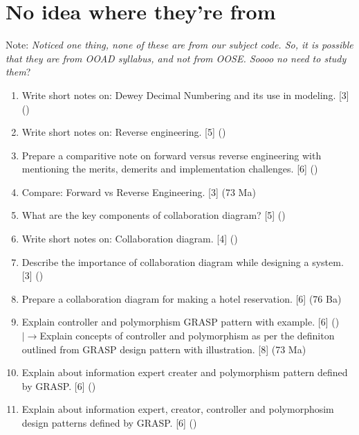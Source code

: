 \documentclass[12pt]{article}
\newcommand{\lb}{\\$\left|\rightarrow\right.$}
\begin{document}
\section{No idea where they're from}
  \begin{center}
    Note: \textit{Noticed one thing, none of these are from our subject code. So, it is possible that they are from OOAD syllabus, and not from OOSE. Soooo no need to study them}?
  \end{center}
  \begin{enumerate}
    \item Write short notes on: Dewey Decimal Numbering and its use in modeling. \hfill [3] ()
    \item Write short notes on: Reverse engineering. \hfill [5] ()

    \item Prepare a comparitive note on forward versus reverse engineering with mentioning the merits, demerits and implementation challenges. \hfill [6] ()

    \item Compare: Forward vs Reverse Engineering. \hfill [3] (73 Ma)

    \item What are the key components of collaboration diagram? \hfill [5] ()

    \item Write short notes on: Collaboration diagram. \hfill [4] ()

    \item Describe the importance of collaboration diagram while designing a system. \hfill [3] ()

    \item Prepare a collaboration diagram for making a hotel reservation. \hfill [6] (76 Ba)

    \item Explain controller and polymorphism GRASP pattern with example. \hfill [6] ()
    \lb Explain concepts of controller and polymorphism as per the definiton outlined from GRASP design pattern with illustration. \hfill [8] (73 Ma)

    \item Explain about information expert creater and polymorphism pattern defined by GRASP. \hfill [6] ()

    \item Explain about information expert, creator, controller and polymorphosim design patterns defined by GRASP. \hfill [6] ()


\end{enumerate}
\end{document}
